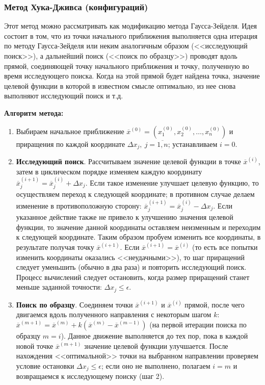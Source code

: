 \documentclass[a4paper,12pt]{report}
\begin{document}
\subsubsection{Метод Хука-Дживса (конфигураций)}
Этот метод можно рассматривать как модификацию метода Гаусса-Зейделя. Идея состоит в том, что из точки начального приближения выполняется одна итерация по методу Гаусса-Зейделя или неким аналогичным образом (<<исследующий поиск>>), а дальнейший поиск (<<поиск по образцу>>) проводят вдоль прямой, соединяющей точку начального приближения и точку, полученную во время исследующего поиска. Когда на этой прямой будет найдена точка, значение целевой функции в которой в известном смысле оптимально, из нее снова выполняют исследующий поиск и т.д.

\textbf{Алгоритм метода:}
\begin{enumerate}
\item Выбираем начальное приближение $\overline{x}^{(0)} = (x^{(0)}_{1}, x^{(0)}_{2}, \ldots, x^{(0)}_{n})$ и приращения по каждой координате $\Delta x_{j},\ j=\overline{1,n}$; устанавливаем $i = 0$.
\item \textbf{Исследующий поиск}. Рассчитываем значение целевой функции в точке $\overline{x}^{(i)}$, затем в циклическом порядке изменяем каждую координату $\overline{x}^{(i+1)}_{j} = \overline{x}^{(i)}_{j} + \Delta x_{j}$. Если такое изменение улучшает целевую функцию, то осуществляем переход к следующей координате; в противном случае делаем изменение в противоположную сторону: $\overline{x}^{(i+1)}_{j} = \overline{x}^{(i)}_{j} - \Delta x_{j}$. Если указанное действие также не привело к улучшению значения целевой функции, то значение данной координаты оставляем неизменным и переходим к следующей координате. Таким образом пробуем изменить все координаты, в результате получая точку $\overline{x}^{(i+1)}$. Если $\overline{x}^{(i+1)} = \overline{x}^{(i)}$ (то есть все попытки изменить координаты оказались <<неудачными>>), то шаг приращений следует уменьшить (обычно в два раза) и повторить исследующий поиск. Процесс вычислений следует остановить, когда размер приращений станет меньше заданной точности: $\Delta x_{j} \leq \epsilon$.
\item \textbf{Поиск по образцу}. Соединяем точки $\overline{x}^{(i+1)}$ и $\overline{x}^{(i)}$ прямой, после чего двигаемся вдоль полученного направления с некоторым шагом $k$: $\overline{x}^{(m+1)} = \overline{x}^{(m)} + k(\overline{x}^{(m)} - \overline{x}^{(m-1)})$ (на первой итерации поиска по образцу $m = i$). Данное движение выполняется до тех пор, пока в каждой новой точке $\overline{x}^{(m+1)}$ значение целевой функции улучшается. После нахождения <<оптимальной>> точки на выбранном направлении проверяем условие остановки $\Delta x_{j} \leq \epsilon$; если оно не выполнено, полагаем $i = m$ и возвращаемся к исследующему поиску (шаг 2).
\end{enumerate}
\end{document}
